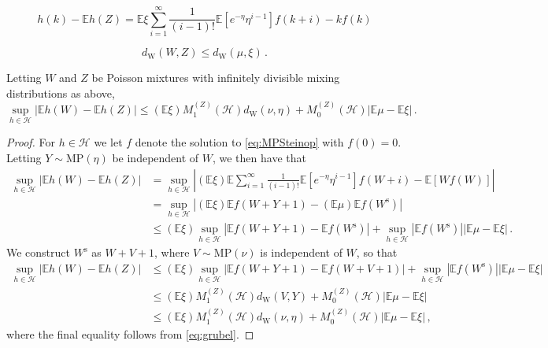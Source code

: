 \documentclass[10pt,a4paper]{amsart}
\begin{document}
\begin{equation}\label{eq:MPSteinop}
h(k)-\mathbb{E}h(Z)=\mathbb{E}\xi\sum_{i=1}^\infty\frac{1}{(i-1)!}\mathbb{E}[e^{-\eta}\eta^{i-1}]f(k+i)-kf(k)
\end{equation}

\begin{equation}\label{eq:grubel}
d_\text{W}(W,Z) \leq d_\text{W}(\mu,\xi)\,.
\end{equation}

\begin{theorem}\label{thm:MP}
Letting $W$ and $Z$ be Poisson mixtures with infinitely divisible mixing distributions as above,
\[
\sup_{h\in\mathcal{H}}|\mathbb{E}h(W)-\mathbb{E}h(Z)|\leq(\mathbb{E}\xi)M_1^{(Z)}(\mathcal{H})d_\text{W}(\nu,\eta)+M_0^{(Z)}(\mathcal{H})|\mathbb{E}\mu-\mathbb{E}\xi|\,.
\]
\end{theorem}

\begin{proof}
For $h\in\mathcal{H}$ we let $f$ denote the solution to \eqref{eq:MPSteinop} with $f(0)=0$. Letting $Y\sim\text{MP}(\eta)$ be independent of $W$, we then have that
\begin{align*}
\sup_{h\in\mathcal{H}}|\mathbb{E}h(W)-\mathbb{E}h(Z)| &=\sup_{h\in\mathcal{H}}\left|(\mathbb{E}\xi)\mathbb{E}\sum_{i=1}^\infty\frac{1}{(i-1)!}\mathbb{E}[e^{-\eta}\eta^{i-1}]f(W+i)-\mathbb{E}[Wf(W)]\right|\\
&=\sup_{h\in\mathcal{H}}\left|(\mathbb{E}\xi)\mathbb{E}f(W+Y+1)-(\mathbb{E}\mu)\mathbb{E}f(W^\text{s})\right|\\
&\leq(\mathbb{E}\xi)\sup_{h\in\mathcal{H}}\left|\mathbb{E}f(W+Y+1)-\mathbb{E}f(W^\text{s})\right|
+\sup_{h\in\mathcal{H}}\left|\mathbb{E}f(W^\text{s})\right|\left|\mathbb{E}\mu-\mathbb{E}\xi\right|\,.
\end{align*}
We construct $W^\text{s}$ as $W+V+1$, where $V\sim\text{MP}(\nu)$ is independent of $W$, so that
\begin{align*}
\sup_{h\in\mathcal{H}}|\mathbb{E}h(W)-\mathbb{E}h(Z)|&\leq(\mathbb{E}\xi)\sup_{h\in\mathcal{H}}\left|\mathbb{E}f(W+Y+1)-\mathbb{E}f(W+V+1)\right|+\sup_{h\in\mathcal{H}}\left|\mathbb{E}f(W^\text{s})\right|\left|\mathbb{E}\mu-\mathbb{E}\xi\right|\\
&\leq(\mathbb{E}\xi)M_1^{(Z)}(\mathcal{H})d_\text{W}(V,Y)+M_0^{(Z)}(\mathcal{H})|\mathbb{E}\mu-\mathbb{E}\xi|\\
&\leq(\mathbb{E}\xi)M_1^{(Z)}(\mathcal{H})d_\text{W}(\nu,\eta)+M_0^{(Z)}(\mathcal{H})|\mathbb{E}\mu-\mathbb{E}\xi|\,,
\end{align*}
where the final equality follows from \eqref{eq:grubel}.
\end{proof}
\end{document}
